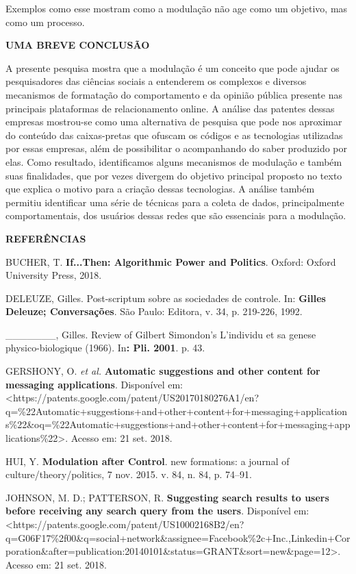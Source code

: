 Exemplos como esse mostram como a modulação não age como um objetivo,
mas como um processo.

\textbf{UMA BREVE CONCLUSÃO}

A presente pesquisa mostra que a modulação é um conceito que pode ajudar
os pesquisadores das ciências sociais a entenderem os complexos e
diversos mecanismos de formatação do comportamento e da opinião pública
presente nas principais plataformas de relacionamento online. A análise
das patentes dessas empresas mostrou-se como uma alternativa de pesquisa
que pode nos aproximar do conteúdo das caixas-pretas que ofuscam os
códigos e as tecnologias utilizadas por essas empresas, além de
possibilitar o acompanhando do saber produzido por elas. Como resultado,
identificamos alguns mecanismos de modulação e também suas finalidades,
que por vezes divergem do objetivo principal proposto no texto que
explica o motivo para a criação dessas tecnologias. A análise também
permitiu identificar uma série de técnicas para a coleta de dados,
principalmente comportamentais, dos usuários dessas redes que são
essenciais para a modulação.

\textbf{REFERÊNCIAS}

BUCHER, T. \textbf{If...Then: Algorithmic Power and Politics}. Oxford:
Oxford University Press, 2018.

DELEUZE, Gilles. Post-scriptum sobre as sociedades de controle. In:
\textbf{Gilles Deleuze; Conversações}. São Paulo: Editora, v. 34, p.
219-226, 1992.

\_\_\_\_\_\_\_, Gilles. Review of Gilbert Simondon's L'individu et sa
genese physico-biologique (1966). In\textbf{: Pli. 2001}. p. 43.

GERSHONY, O. \emph{et al.} \textbf{Automatic suggestions and other
content for messaging applications}. Disponível em:
\textless{}https://patents.google.com/patent/US20170180276A1/en?q=\%22Automatic+suggestions+and+other+content+for+messaging+applications\%22\&oq=\%22Automatic+suggestions+and+other+content+for+messaging+applications\%22\textgreater{}.
Acesso em: 21 set. 2018.

HUI, Y. \textbf{Modulation after Control}. new formations: a journal of
culture/theory/politics, 7 nov. 2015. v. 84, n. 84, p. 74--91.

JOHNSON, M. D.; PATTERSON, R. \textbf{Suggesting search results to users
before receiving any search query from the users}. Disponível em:
\textless{}https://patents.google.com/patent/US10002168B2/en?q=G06F17\%2f00\&q=social+network\&assignee=Facebook\%2c+Inc.,Linkedin+Corporation\&after=publication:20140101\&status=GRANT\&sort=new\&page=12\textgreater{}.
Acesso em: 21 set. 2018.

